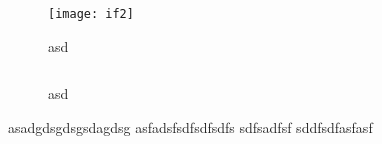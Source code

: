 \begin{figure}[h!]
	\begin{minipage}[b]{0.65\linewidth}
		\centering
		\texttt{[image: if2]}
		\caption{asd}
		\label{fig:ifImage2}
	\end{minipage}
	\hspace{0.5cm}
	\begin{minipage}[b]{0.25\linewidth}
		\centering
		\inputminted{haskell}{codes/ifCode2.hs}
		\caption{asd}
		\label{fig:ifCode2}
	\end{minipage}
\end{figure}

asadgdsgdsgsdagdsg asfadsfsdfsdfsdfs
sdfsadfsf
\cite{hughes}
\cite{swierstra}
\cite{olaf}
\cite{wadler}
\cite{peytonJones}
\cite{ocamlFormat}
sddfsdfasfasf